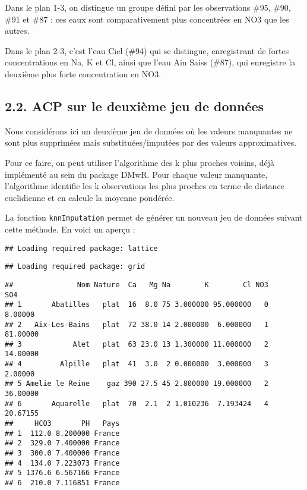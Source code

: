 \documentclass[]{article}
\begin{document}
Dans le plan 1-3, on distingue un groupe défini par les observations
\#95, \#90, \#91 et \#87 : ces eaux sont comparativement plus
concentrées en NO3 que les autres.

Dans le plan 2-3, c'est l'eau Ciel (\#94) qui se distingue, enregistrant
de fortes concentrations en Na, K et Cl, ainsi que l'eau Ain Saiss
(\#87), qui enregistre la deuxième plus forte concentration en NO3.

\hypertarget{acp-sur-le-deuxieme-jeu-de-donnees}{\subsection{2.2. ACP
sur le deuxième jeu de
données}\label{acp-sur-le-deuxieme-jeu-de-donnees}}

Nous considérons ici un deuxième jeu de données où les valeurs
manquantes ne sont plus supprimées mais substituées/imputées par des
valeurs approximatives.

Pour ce faire, on peut utiliser l'algorithme des k plus proches voisins,
déjà implémenté au sein du package DMwR. Pour chaque valeur manquante,
l'algorithme identifie les k observations les plus proches en terme de
distance euclidienne et en calcule la moyenne pondérée.

La fonction \texttt{knnImputation} permet de générer un nouveau jeu de
données suivant cette méthode. En voici un aperçu :

\begin{verbatim}
## Loading required package: lattice
\end{verbatim}

\begin{verbatim}
## Loading required package: grid
\end{verbatim}

\begin{verbatim}
##               Nom Nature  Ca   Mg Na        K        Cl NO3      SO4
## 1       Abatilles   plat  16  8.0 75 3.000000 95.000000   0  8.00000
## 2   Aix-Les-Bains   plat  72 38.0 14 2.000000  6.000000   1 81.00000
## 3            Alet   plat  63 23.0 13 1.300000 11.000000   2 14.00000
## 4         Alpille   plat  41  3.0  2 0.000000  3.000000   3  2.00000
## 5 Amelie le Reine    gaz 390 27.5 45 2.800000 19.000000   2 36.00000
## 6       Aquarelle   plat  70  2.1  2 1.010236  7.193424   4 20.67155
##     HCO3       PH   Pays
## 1  112.0 8.200000 France
## 2  329.0 7.400000 France
## 3  300.0 7.400000 France
## 4  134.0 7.223073 France
## 5 1376.6 6.567166 France
## 6  210.0 7.116851 France
\end{verbatim}
\end{document}
